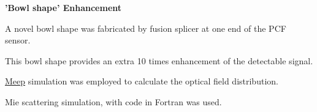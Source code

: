 \documentclass[10pt]{article}
\newenvironment{outerlist}[1][\enskip\textbullet]%
        {\begin{enumerate}[#1]}{\end{enumerate}%
         \vspace{-.6\baselineskip}}
\newenvironment{innerlist}[1][\enskip\textbullet]%
        {\begin{compactenum}[#1]}{\end{compactenum}}
\newcommand{\blankline}{\quad\pagebreak[2]}
\begin{document}
\begin{outerlist}
\item[] \textbf{'Bowl shape' Enhancement}
        \begin{innerlist}
        \item A novel bowl shape was fabricated by fusion splicer at one end of the PCF sensor.
        \item This bowl shape provides an extra 10 times enhancement of the detectable signal.
        \item \href{http://ab-initio.mit.edu/meep/}{Meep} simulation was employed to calculate the optical field distribution.
        \item Mie scattering simulation, with code in Fortran was used.
        \end{innerlist}

\end{outerlist}


\end{document}
